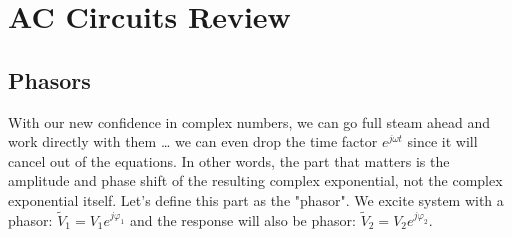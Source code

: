 \section{AC Circuits Review}
\subsection{Phasors}
With our new confidence in complex numbers, we can go full steam ahead and work directly with them … we can even drop the time factor $e^{j\omega t}$ since it will cancel out of the equations.  In other words, the part that matters is the amplitude and phase shift of the resulting complex exponential, not the complex exponential itself.  Let's define this part as the "phasor".
We excite system with a phasor: ${\tilde V_1} = {V_1}{e^{j{\varphi _1}}}$ and the response  will also be phasor: ${\tilde V_2} = {V_2}{e^{j{\varphi _2}}}$.   
